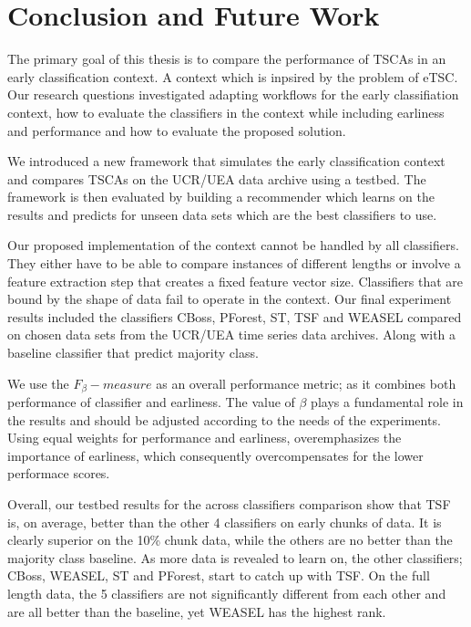 \chapter{Conclusion and Future Work}
\label{ChapterConclusion}
The primary goal of this thesis is to compare the performance of TSCAs in an early classification context.
A context which is inpsired by the problem of eTSC. Our research questions investigated adapting workflows
for the early classifiation context, how to evaluate the classifiers in the context while including earliness and performance
and how to evaluate the proposed solution.

We introduced a new framework that simulates the early classification context and compares TSCAs on the UCR/UEA data archive using a testbed.
The framework is then evaluated by building a recommender which learns on the results and predicts for unseen data sets which are the best classifiers to use.

Our proposed implementation of the context cannot be handled by all classifiers.
They either have to be able to compare instances of different lengths or involve a feature extraction step that creates a fixed feature vector size.
Classifiers that are bound by the shape of data fail to operate in the context.
Our final experiment results included the classifiers CBoss, PForest, ST, TSF and WEASEL compared on chosen data sets from the UCR/UEA time series data archives.
Along with a baseline classifier that predict majority class.

We use the $F_{\beta}-measure$ as an overall performance metric; as it combines both performance of classifier and earliness.
The value of $\beta$ plays a fundamental role in the results and should be adjusted according to the needs of the experiments.
Using equal weights for performance and earliness, overemphasizes the importance of earliness, which consequently overcompensates for the lower performace scores.

Overall, our testbed results for the across classifiers comparison show that TSF is, on average, better than the other 4 classifiers on early chunks of data.
It is clearly superior on the 10\% chunk data, while the others are no better than the majority class baseline.
As more data is revealed to learn on, the other classifiers; CBoss, WEASEL, ST and PForest, start to catch up with TSF.
On the full length data, the 5 classifiers are not significantly different from each other and are all better than the baseline, yet WEASEL has the highest rank.

